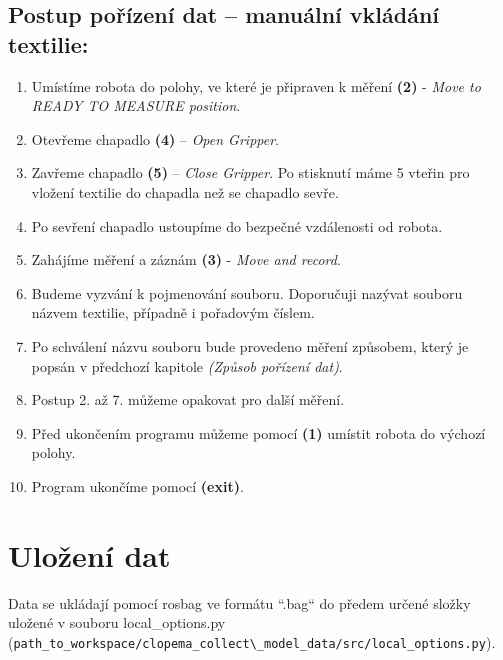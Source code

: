 \documentclass[10pt,a4paper,titlepage,oneside]{report}
\begin{document}
\section{Postup pořízení dat – manuální vkládání textilie:}
\begin{enumerate}
  \item Umístíme robota do polohy, ve které je připraven k měření \textbf{(2)} - \textit{Move to READY TO MEASURE position}.
  \item Otevřeme chapadlo \textbf{(4)} – \textit{Open Gripper}.
  \item Zavřeme chapadlo \textbf{(5)} – \textit{Close Gripper}. Po stisknutí máme 5 vteřin pro vložení textilie do chapadla než se chapadlo sevře.
  \item Po sevření chapadlo ustoupíme do bezpečné vzdálenosti od robota.
  \item Zahájíme měření a záznám \textbf{(3)} - \textit{Move and record}.
  \item Budeme vyzvání k pojmenování souboru. Doporučuji nazývat souboru názvem textilie, případně i pořadovým číslem.
  \item Po schválení názvu souboru bude provedeno měření způsobem, který je popsán v předchozí kapitole \textit{(Způsob pořízení dat)}.
  \item Postup 2. až 7. můžeme opakovat pro další měření.
  \item Před ukončením programu můžeme pomocí \textbf{(1)} umístit robota do výchozí polohy.
  \item Program ukončíme pomocí \textbf{(exit)}.
\end{enumerate}

\chapter{Uložení dat}
Data se ukládají pomocí rosbag ve formátu “.bag“ do předem určené složky uložené v souboru local\_options.py (\verb|path_to_workspace/clopema_collect\_model_data/src/local_options.py|).\\
\\
\end{document}
